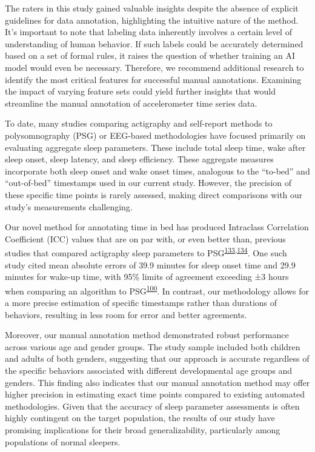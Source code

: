 \documentclass[
  10pt,
]{scrbook}
\begin{document}
The raters in this study gained valuable insights despite the absence of
explicit guidelines for data annotation, highlighting the intuitive
nature of the method. It's important to note that labeling data
inherently involves a certain level of understanding of human behavior.
If such labels could be accurately determined based on a set of formal
rules, it raises the question of whether training an AI model would even
be necessary. Therefore, we recommend additional research to identify
the most critical features for successful manual annotations. Examining
the impact of varying feature sets could yield further insights that
would streamline the manual annotation of accelerometer time series
data.

To date, many studies comparing actigraphy and self-report methods to
polysomnography (PSG) or EEG-based methodologies have focused primarily
on evaluating aggregate sleep parameters. These include total sleep
time, wake after sleep onset, sleep latency, and sleep efficiency. These
aggregate measures incorporate both sleep onset and wake onset times,
analogous to the ``to-bed'' and ``out-of-bed'' timestamps used in our
current study. However, the precision of these specific time points is
rarely assessed, making direct comparisons with our study's measurements
challenging.

Our novel method for annotating time in bed has produced Intraclass
Correlation Coefficient (ICC) values that are on par with, or even
better than, previous studies that compared actigraphy sleep parameters
to
PSG\textsuperscript{\protect\hyperlink{ref-haghayegh_application_2020}{133},\protect\hyperlink{ref-yavuz-kodat_2019}{134}}.
One such study cited mean absolute errors of 39.9 minutes for sleep
onset time and 29.9 minutes for wake-up time, with 95\% limits of
agreement exceeding ±3 hours when comparing an algorithm to
PSG\textsuperscript{\protect\hyperlink{ref-van_hees_estimating_2018}{100}}.
In contrast, our methodology allows for a more precise estimation of
specific timestamps rather than durations of behaviors, resulting in
less room for error and better agreements.

Moreover, our manual annotation method demonstrated robust performance
across various age and gender groups. The study sample included both
children and adults of both genders, suggesting that our approach is
accurate regardless of the specific behaviors associated with different
developmental age groups and genders. This finding also indicates that
our manual annotation method may offer higher precision in estimating
exact time points compared to existing automated methodologies. Given
that the accuracy of sleep parameter assessments is often highly
contingent on the target population, the results of our study have
promising implications for their broad generalizability, particularly
among populations of normal sleepers.
\end{document}
